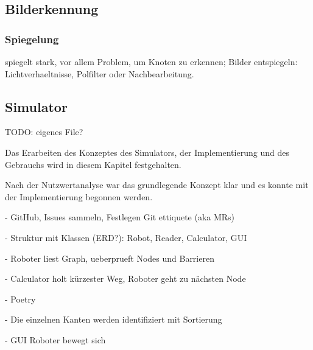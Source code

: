 \subsection{Bilderkennung}

\subsubsection{Spiegelung}

spiegelt stark, vor allem Problem, um Knoten zu erkennen; Bilder entspiegeln: Lichtverhaeltnisse, Polfilter oder Nachbearbeitung.\cite{avoid-reflection}

\subsection{Simulator}

TODO: eigenes File?

Das Erarbeiten des Konzeptes des Simulators, der Implementierung und des Gebrauchs wird in diesem Kapitel festgehalten.

Nach der Nutzwertanalyse war das grundlegende Konzept klar und es konnte mit der Implementierung begonnen werden.

- GitHub, Issues sammeln, Festlegen Git ettiquete (aka MRs)

- Struktur mit Klassen (ERD?): Robot, Reader, Calculator, GUI

- Roboter liest Graph, ueberprueft Nodes und Barrieren

- Calculator holt kürzester Weg, Roboter geht zu nächsten Node

- Poetry

- Die einzelnen Kanten werden identifiziert mit Sortierung

- GUI Roboter bewegt sich

